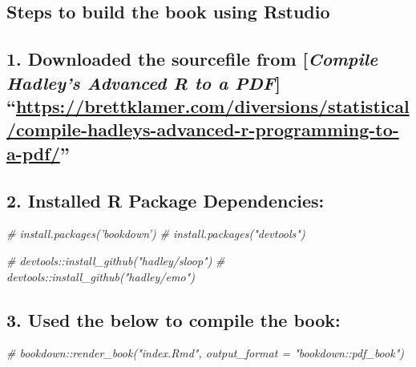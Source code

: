 \documentclass[
]{article}
\newenvironment{Shaded}{\begin{snugshade}}{\end{snugshade}}
\newcommand{\CommentTok}[1]{\textcolor[rgb]{0.56,0.35,0.01}{\textit{#1}}}
\begin{document}
\hypertarget{steps-to-build-the-book-using-rstudio}{%
\subsection{Steps to build the book using
Rstudio}\label{steps-to-build-the-book-using-rstudio}}

\hypertarget{downloaded-the-sourcefile-from-compile-hadleys-advanced-r-to-a-pdf-httpsbrettklamer.comdiversionsstatisticalcompile-hadleys-advanced-r-programming-to-a-pdf}{%
\subsection{\texorpdfstring{1. Downloaded the sourcefile from
{[}\emph{Compile Hadley's Advanced R to a PDF}{]}
``\url{https://brettklamer.com/diversions/statistical/compile-hadleys-advanced-r-programming-to-a-pdf/}''}{1. Downloaded the sourcefile from {[}Compile Hadley's Advanced R to a PDF{]} ``https://brettklamer.com/diversions/statistical/compile-hadleys-advanced-r-programming-to-a-pdf/''}}\label{downloaded-the-sourcefile-from-compile-hadleys-advanced-r-to-a-pdf-httpsbrettklamer.comdiversionsstatisticalcompile-hadleys-advanced-r-programming-to-a-pdf}}

\hypertarget{installed-r-package-dependencies}{%
\subsection{2. Installed R Package
Dependencies:}\label{installed-r-package-dependencies}}

\begin{Shaded}
\begin{Highlighting}[]
\CommentTok{# install.packages('bookdown') }
\CommentTok{# install.packages("devtools")}

\CommentTok{# devtools::install_github("hadley/sloop")}
\CommentTok{# devtools::install_github("hadley/emo")}
\end{Highlighting}
\end{Shaded}

\hypertarget{used-the-below-to-compile-the-book}{%
\subsection{3. Used the below to compile the
book:}\label{used-the-below-to-compile-the-book}}

\begin{Shaded}
\begin{Highlighting}[]
\CommentTok{# bookdown::render_book("index.Rmd", output_format = "bookdown::pdf_book")}
\end{Highlighting}
\end{Shaded}
\end{document}
